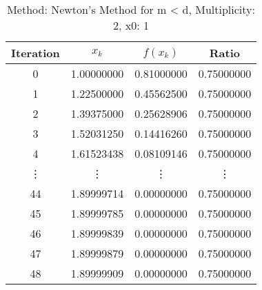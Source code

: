 \begin{table}
\centering
\caption{Method: Newton's Method for m < d, Multiplicity: 2, x0: 1}
\label{tab:table_Newton's_Method_for_m_<_d_2_1}
\begin{tabular}{c c c c}
\toprule
Iteration &      $x_k$ &   $f(x_k)$ &      Ratio \\
\midrule
        0 & 1.00000000 & 0.81000000 & 0.75000000 \\
        1 & 1.22500000 & 0.45562500 & 0.75000000 \\
        2 & 1.39375000 & 0.25628906 & 0.75000000 \\
        3 & 1.52031250 & 0.14416260 & 0.75000000 \\
        4 & 1.61523438 & 0.08109146 & 0.75000000 \\
   \vdots &     \vdots &     \vdots &     \vdots \\
       44 & 1.89999714 & 0.00000000 & 0.75000000 \\
       45 & 1.89999785 & 0.00000000 & 0.75000000 \\
       46 & 1.89999839 & 0.00000000 & 0.75000000 \\
       47 & 1.89999879 & 0.00000000 & 0.75000000 \\
       48 & 1.89999909 & 0.00000000 & 0.75000000 \\
\bottomrule
\end{tabular}
\end{table}
